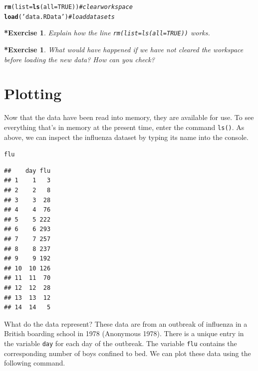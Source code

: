 \documentclass{article}\usepackage[]{graphicx}\usepackage[]{color}
\makeatletter
\newcommand{\hlnum}[1]{\textcolor[rgb]{0.686,0.059,0.569}{#1}}%
\newcommand{\hlstr}[1]{\textcolor[rgb]{0.192,0.494,0.8}{#1}}%
\newcommand{\hlcom}[1]{\textcolor[rgb]{0.678,0.584,0.686}{\textit{#1}}}%
\newcommand{\hlstd}[1]{\textcolor[rgb]{0.345,0.345,0.345}{#1}}%
\newcommand{\hlkwc}[1]{\textcolor[rgb]{0.333,0.667,0.333}{#1}}%
\newcommand{\hlkwd}[1]{\textcolor[rgb]{0.737,0.353,0.396}{\textbf{#1}}}%
\newenvironment{kframe}{%
 \def\at@end@of@kframe{}%
 \ifinner\ifhmode%
  \def\at@end@of@kframe{\end{minipage}}%
  \begin{minipage}{\columnwidth}%
 \fi\fi%
 \def\FrameCommand##1{\hskip\@totalleftmargin \hskip-\fboxsep
 \colorbox{shadecolor}{##1}\hskip-\fboxsep
     \hskip-\linewidth \hskip-\@totalleftmargin \hskip\columnwidth}%
 \MakeFramed {\advance\hsize-\width
   \@totalleftmargin\z@ \linewidth\hsize
   \@setminipage}}%
 {\par\unskip\endMakeFramed%
 \at@end@of@kframe}
\newenvironment{knitrout}{}{} %
\newcommand{\code}[1]{\texttt{#1}}
\theoremstyle{exercise}
\newtheorem{challenge}[exercise]{*Exercise}
\makeatother
\begin{document}
\begin{knitrout}
\color{fgcolor}\begin{kframe}
\begin{alltt}
\hlkwd{rm}\hlstd{(}\hlkwc{list}\hlstd{=}\hlkwd{ls}\hlstd{(}\hlkwc{all}\hlstd{=}\hlnum{TRUE}\hlstd{))}    \hlcom{# clear workspace}
\hlkwd{load}\hlstd{(}\hlstr{'data.RData'}\hlstd{)}       \hlcom{# load data sets}
\end{alltt}
\end{kframe}
\end{knitrout}

\begin{challenge}
  Explain how the line \code{rm(list=ls(all=TRUE))} works.
\end{challenge}

\begin{challenge}
  What would have happened if we have not cleared the workspace before loading the new data? How can you check?
\end{challenge}

\section{Plotting}

Now that the data have been read into memory, they are available for use. To see everything that's in memory at the present time, enter
the command \code{ls()}. As above, we can inspect the influenza dataset by typing its name into the console.

\begin{knitrout}
\color{fgcolor}\begin{kframe}
\begin{alltt}
\hlstd{flu}
\end{alltt}
\begin{verbatim}
##    day flu
## 1    1   3
## 2    2   8
## 3    3  28
## 4    4  76
## 5    5 222
## 6    6 293
## 7    7 257
## 8    8 237
## 9    9 192
## 10  10 126
## 11  11  70
## 12  12  28
## 13  13  12
## 14  14   5
\end{verbatim}
\end{kframe}
\end{knitrout}

What do the data represent? These data are from an outbreak of influenza in a British boarding school in 1978 (Anonymous 1978). There is a unique entry in the variable \code{day} for each day of the outbreak. The variable \code{flu} contains the corresponding number of boys confined to bed. We can plot these data using the following command.
\end{document}
